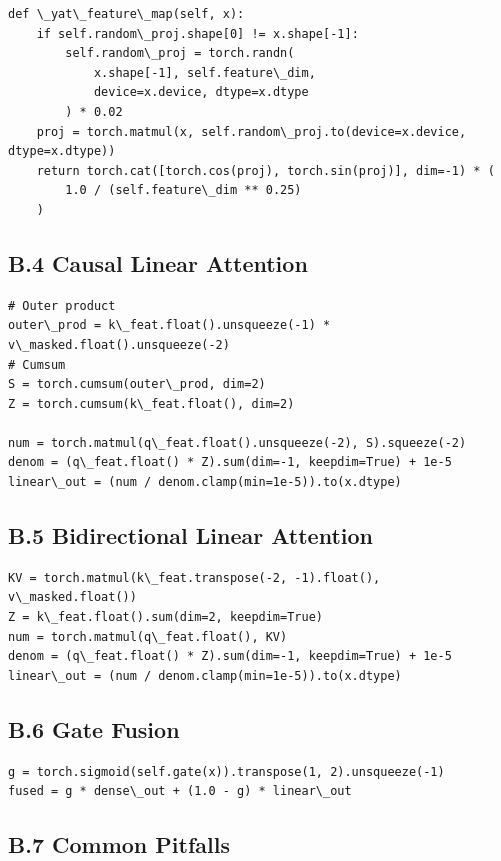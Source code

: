 \begin{lstlisting}
def \_yat\_feature\_map(self, x):
    if self.random\_proj.shape[0] != x.shape[-1]:
        self.random\_proj = torch.randn(
            x.shape[-1], self.feature\_dim, 
            device=x.device, dtype=x.dtype
        ) * 0.02
    proj = torch.matmul(x, self.random\_proj.to(device=x.device, dtype=x.dtype))
    return torch.cat([torch.cos(proj), torch.sin(proj)], dim=-1) * (
        1.0 / (self.feature\_dim ** 0.25)
    )
\end{lstlisting}

\subsection{B.4 Causal Linear Attention}

\begin{lstlisting}
# Outer product
outer\_prod = k\_feat.float().unsqueeze(-1) * v\_masked.float().unsqueeze(-2)
# Cumsum
S = torch.cumsum(outer\_prod, dim=2)
Z = torch.cumsum(k\_feat.float(), dim=2)

num = torch.matmul(q\_feat.float().unsqueeze(-2), S).squeeze(-2)
denom = (q\_feat.float() * Z).sum(dim=-1, keepdim=True) + 1e-5
linear\_out = (num / denom.clamp(min=1e-5)).to(x.dtype)
\end{lstlisting}

\subsection{B.5 Bidirectional Linear Attention}

\begin{lstlisting}
KV = torch.matmul(k\_feat.transpose(-2, -1).float(), v\_masked.float())
Z = k\_feat.float().sum(dim=2, keepdim=True)
num = torch.matmul(q\_feat.float(), KV)
denom = (q\_feat.float() * Z).sum(dim=-1, keepdim=True) + 1e-5
linear\_out = (num / denom.clamp(min=1e-5)).to(x.dtype)
\end{lstlisting}

\subsection{B.6 Gate Fusion}

\begin{lstlisting}
g = torch.sigmoid(self.gate(x)).transpose(1, 2).unsqueeze(-1)
fused = g * dense\_out + (1.0 - g) * linear\_out
\end{lstlisting}

\subsection{B.7 Common Pitfalls}

